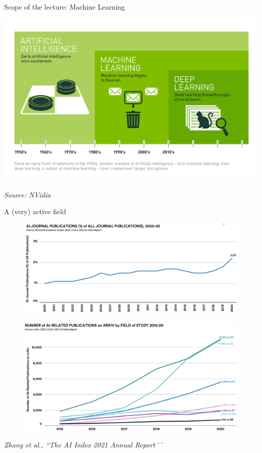 \documentclass[handout]{beamer}
\newcommand{\rref}[1][]{\hfill{\scriptsize\textit{#1}}}
\begin{document}
\begin{frame}{Scope of the lecture: Machine Learning}
 \begin{center}
     \includegraphics[width=\textwidth]{fig/L1/Deep_Learning_Icons_R5_PNG.png}
 \end{center}
 \rref[Source: NVidia]
 \end{frame}
 \begin{frame}{A (very) active field}

\begin{figure}
\includegraphics[width=.6\textwidth]{fig/L1/progress-papers.png}
\end{figure}

\begin{figure}
\includegraphics[width=.6\textwidth] {fig/L1/progress-ml.png}
\end{figure}

  \rref[Zhang et al., ``The AI Index 2021 Annual Report´´]

\end{frame}
\end{document}
